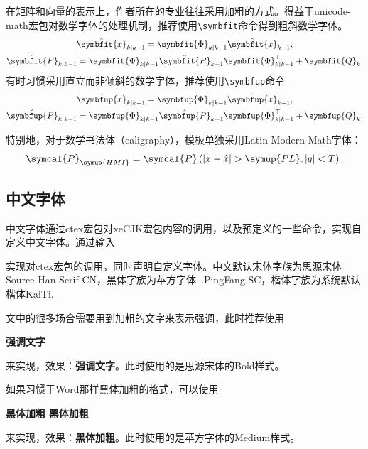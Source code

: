 \documentclass{gunote}
\newcommand{\cmd}[1]{\texttt{\backslash #1}}
\def\mbi{\symbfit}
\def\mbu{\symbfup}
\begin{document}
在矩阵和向量的表示上，作者所在的专业往往采用加粗的方式。得益于\textsf{unicode-math}宏包对数学字体的处理机制，推荐使用\cmd{symbfit}命令得到粗斜数学字体。
\begin{gather}
  \hat{\mbi{x}}_{k\mid k-1}=\mbi{\Phi}_{k\mid k-1}\hat{\mbi{x}}_{k-1},\\
  \hat{\mbi{P}}_{k\mid k-1}=\mbi{\Phi}_{k\mid k-1}\hat{\mbi{P}}_{k-1}\mbi{\Phi}_{k\mid k-1}^\top+\mbi{Q}_k.
\end{gather}
有时习惯采用直立而非倾斜的数学字体，推荐使用\cmd{symbfup}命令
\begin{gather}
  \hat{\mbu{x}}_{k\mid k-1}=\mbu{\Phi}_{k\mid k-1}\hat{\mbu{x}}_{k-1},\\
  \hat{\mbu{P}}_{k\mid k-1}=\mbu{\Phi}_{k\mid k-1}\hat{\mbu{P}}_{k-1}\mbu{\Phi}_{k\mid k-1}^\top+\mbu{Q}_k.
\end{gather}

特别地，对于数学书法体（caligraphy），模板单独采用Latin Modern Math字体：
\begin{equation}
  \symcal{P}_{\symup{HMI}}=\symcal{P}\left(\vert x-\hat{x}\vert>\symup{PL},\vert q\vert<T\right).
\end{equation}
\subsection{中文字体}
中文字体通过\textsf{ctex}宏包对\textsf{xeCJK}宏包内容的调用，以及预定义的一些命令，实现自定义中文字体。通过输入
\begin{Code*}[latex]
\end{Code*}
实现对\textsf{ctex}宏包的调用，同时声明自定义字体。中文默认宋体字族为思源宋体Source Han Serif CN，黑体字族为苹方字体\ .PingFang SC，楷体字族为系统默认楷体KaiTi.

文中的很多场合需要用到加粗的文字来表示强调，此时推荐使用
\begin{Code*}[latex]
\textbf{强调文字}
\end{Code*}
来实现，效果：\textbf{强调文字}。此时使用的是思源宋体的Bold样式。

如果习惯于Word那样黑体加粗的格式，可以使用
\begin{Code*}[latex]
{\bfseries\sffamily 黑体加粗}
\textbf{\heiti 黑体加粗}
\end{Code*}
来实现，效果：{\bfseries\sffamily 黑体加粗}。此时使用的是苹方字体的Medium样式。
\end{document}
